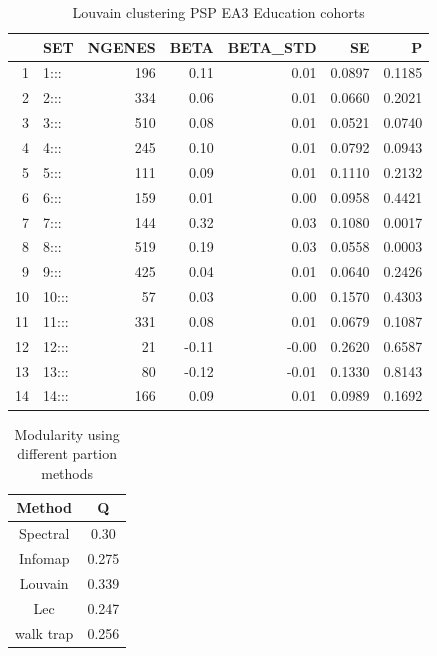\begin{table}[ht]
\centering
\begin{tabular}{rlrrrrr}
  \hline
 & SET & NGENES & BETA & BETA\_STD & SE & P \\ 
  \hline
1 & 1::: & 196 & 0.11 & 0.01 & 0.0897 & 0.1185 \\ 
  2 & 2::: & 334 & 0.06 & 0.01 & 0.0660 & 0.2021 \\ 
  3 & 3::: & 510 & 0.08 & 0.01 & 0.0521 & 0.0740 \\ 
  4 & 4::: & 245 & 0.10 & 0.01 & 0.0792 & 0.0943 \\ 
  5 & 5::: & 111 & 0.09 & 0.01 & 0.1110 & 0.2132 \\ 
  6 & 6::: & 159 & 0.01 & 0.00 & 0.0958 & 0.4421 \\ 
  7 & 7::: & 144 & 0.32 & 0.03 & 0.1080 & 0.0017 \\ 
  8 & 8::: & 519 & 0.19 & 0.03 & 0.0558 & 0.0003 \\ 
  9 & 9::: & 425 & 0.04 & 0.01 & 0.0640 & 0.2426 \\ 
  10 & 10::: & 57 & 0.03 & 0.00 & 0.1570 & 0.4303 \\ 
  11 & 11::: & 331 & 0.08 & 0.01 & 0.0679 & 0.1087 \\ 
  12 & 12::: & 21 & -0.11 & -0.00 & 0.2620 & 0.6587 \\ 
  13 & 13::: & 80 & -0.12 & -0.01 & 0.1330 & 0.8143 \\ 
  14 & 14::: & 166 & 0.09 & 0.01 & 0.0989 & 0.1692 \\ 
   \hline
\end{tabular}
\caption{Louvain clustering PSP EA3 Education cohorts}
\label{tab:Louvain clustering EA3 Education cohorts}
\end{table}

\begin{table}[]
    \centering
    \begin{tabular}{cc}
    \toprule
        Method & Q \\
        \midrule
        Spectral & 0.30\\
        Infomap & 0.275\\
        Louvain & 0.339\\
        Lec & 0.247\\
        walk trap & 0.256\\
        \bottomrule
    \end{tabular}
    \caption{Modularity using different partion methods}
    \label{tab:modularity}
\end{table}


